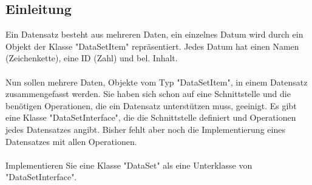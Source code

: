 \documentclass[]{article}
\begin{document}
\subsection{\bf Einleitung \normalfont\\[0.5cm]}
Ein Datensatz besteht aus mehreren Daten, ein einzelnes Datum wird durch ein Objekt der Klasse "DataSetItem" repräsentiert.
Jedes Datum hat einen Namen (Zeichenkette), eine ID (Zahl) und bel. Inhalt.\\
\\
Nun sollen mehrere Daten, Objekte vom Typ "DataSetItem", in einem Datensatz zusammengefasst werden.
Sie haben sich schon auf eine Schnittstelle und die benötigen Operationen, die ein Datensatz unterstützen muss, geeinigt.
Es gibt eine Klasse "DataSetInterface", die die Schnittstelle definiert und Operationen jedes Datensatzes angibt.
Bisher fehlt aber noch die Implementierung eines Datensatzes mit allen Operationen.\\
\\
Implementieren Sie eine Klasse "DataSet" als eine Unterklasse von "DataSetInterface".\\
\\
\end{document}
